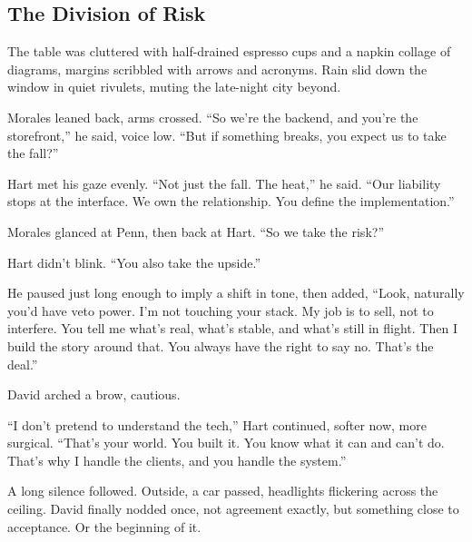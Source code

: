 \medskip

\subsection{The Division of Risk}

The table was cluttered with half-drained espresso cups and a napkin collage of diagrams, margins scribbled with 
arrows and acronyms. Rain slid down the window in quiet rivulets, muting the late-night city beyond.

Morales leaned back, arms crossed. “So we’re the backend, and you’re the storefront,” he said, voice low. “But 
if something breaks, you expect us to take the fall?”

Hart met his gaze evenly. “Not just the fall. The heat,” he said. “Our liability stops at the interface. We own 
the relationship. You define the implementation.”

Morales glanced at Penn, then back at Hart. “So we take the risk?”

Hart didn’t blink. “You also take the upside.”

He paused just long enough to imply a shift in tone, then added, “Look, naturally you'd have veto power. 
I’m not touching your stack. My job is to sell, not to interfere. You tell me what’s real, what’s stable, 
and what’s still in flight. Then I build the story around that. You always have the right to say no. 
That’s the deal.”

David arched a brow, cautious.

“I don’t pretend to understand the tech,” Hart continued, softer now, more surgical. “That’s your world. You built it. 
You know what it can and can’t do. That’s why I handle the clients, and you handle the system.”

A long silence followed. Outside, a car passed, headlights flickering across the ceiling. David finally nodded once, 
not agreement exactly, but something close to acceptance. Or the beginning of it.

\medskip

